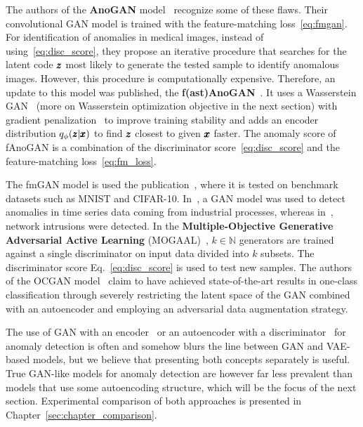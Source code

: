 The authors of the \textbf{AnoGAN} model~\cite{schlegl2017unsupervised} recognize some of these flaws. Their convolutional GAN model is trained with the feature-matching loss~\eqref{eq:fmgan}. For identification of anomalies in medical images, instead of using~\eqref{eq:disc_score}, they propose an iterative procedure that searches for the latent code $\pmb{{z}}$ most likely to generate the tested sample to identify anomalous images. However, this procedure is computationally expensive. Therefore, an update to this model was published, the \textbf{f(ast)AnoGAN}~\cite{schleglFAnoGANFastUnsupervised2019}. It uses a Wasserstein GAN~\cite{gulrajani2017improved,haloui2018anomaly} (more on Wasserstein optimization objective in the next section) with gradient penalization~\cite{gulrajani2017improved} to improve training stability and adds an encoder distribution $q_{\phi}(\pmb{{z}}|\pmb{{x}})$ to find $\pmb{{z}}$ closest to given $\pmb{{x}}$ faster. The anomaly score of fAnoGAN is a combination of the discriminator score~\eqref{eq:disc_score} and the feature-matching loss~\eqref{eq:fm_loss}. 

The fmGAN model is used the publication~\cite{kliger2018novelty}, where it is tested on benchmark datasets such as MNIST and CIFAR-10. In~\cite{wang2018generative}, a GAN model was used to detect anomalies in time series data coming from industrial processes, whereas in~\cite{zenatiEfficientGANBasedAnomaly2018}, network intrusions were detected. In the \textbf{Multiple-Objective Generative Adversarial Active Learning} (MOGAAL)~\cite{liu2019generative}, $k \in \mathbb{N}$ generators are trained against a single discriminator on input data divided into $k$ subsets. The discriminator score Eq.~\eqref{eq:disc_score} is used to test new samples. The authors of the OCGAN model~\cite{perera2019ocgan} claim to have achieved state-of-the-art results in one-class classification through severely restricting the latent space of the GAN combined with an autoencoder and employing an adversarial data augmentation strategy. 

The use of GAN with an encoder~\cite{donahue2016adversarial} or an autoencoder with a discriminator~\cite{leveau2017adversarial} for anomaly detection is often and somehow blurs the line between GAN and VAE-based models, but we believe that presenting both concepts separately is useful. True GAN-like models for anomaly detection are however far less prevalent than models that use some autoencoding structure, which will be the focus of the next section. Experimental comparison of both approaches is presented in Chapter~\ref{sec:chapter_comparison}.

